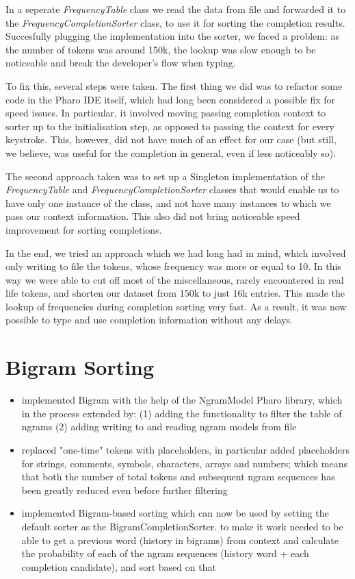 In a seperate \textit{FrequencyTable} class we read the data from file and forwarded it to the \textit{FrequencyCompletionSorter} class, to use it for sorting the completion results. Succesfully plugging the implementation into the sorter, we faced a problem: as the number of tokens was around 150k, the lookup was slow enough to be noticeable and break the developer's flow when typing. 

To fix this, several steps were taken. The first thing we did was to refactor some code in the Pharo IDE itself, which had long been considered a possible fix for speed issues. In particular, it involved moving passing completion context to sorter up to the initialisation step, as opposed to passing the context for every keystroke. This, however, did not have much of an effect for our case (but still, we believe, was useful for the completion in general, even if less noticeably so).

The second approach taken was to set up a Singleton implementation of the \textit{FrequencyTable} and \textit{FrequencyCompletionSorter} classes that would enable us to have only one instance of the class, and not have many instances to which we pass our context information. This also did not bring noticeable speed improvement for sorting completions.

In the end, we tried an approach which we had long had in mind, which involved only writing to file the tokens, whose frequency was more or equal to 10. In this way we were able to cut off most of the miscellaneous, rarely encountered in real life tokens, and shorten our dataset from 150k to just 16k entries. This made the lookup of frequencies during completion sorting very fast. As a result, it was now possible to type and use completion information without any delays.

\section{Bigram Sorting}
\begin{itemize}
    \item implemented Bigram with the help of the NgramModel Pharo library, which in the process extended by: (1) adding the functionality to filter the table of ngrams (2) adding writing to and reading ngram models from file
    \item replaced "one-time" tokens with placeholders, in particular added placeholders for strings, comments, symbols, characters, arrays and numbers; which means that both the number of total tokens and subsequent ngram sequences has been greatly reduced even before further filtering
    \item implemented Bigram-based sorting which can now be used by setting the default sorter as the BigramCompletionSorter. to make it work needed to be able to get a previous word (history in bigrams) from context and calculate the probability of each of the ngram sequences (history word + each completion candidate), and sort based on that
\end{itemize}